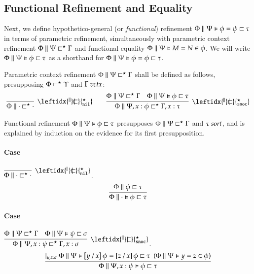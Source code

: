 \documentclass[11pt]{article}
\theoremstyle{definition}
\theoremstyle{remark}
\numberwithin{equation}{section}
\def\IModeColorName{MidnightBlue}
\def\OModeColorName{Maroon}
\def\IModeColorName{Black}
\def\OModeColorName{Black}
\newcommand\IMode[1]{{\color{\IModeColorName}{#1}}}
\newcommand\OMode[1]{{\color{\OModeColorName}{#1}}}
\newcommand\HypJ[2]{#1\ \ (#2)}
\newcommand\GenJ[2]{\vert_{\IMode{#1}}\; #2}
\newcommand\IsSort[1]{\IMode{#1}\ \textit{sort}}
\newcommand\IsVarCtx[1]{\IMode{#1}\ \textit{vctx}}
\newcommand\Subst[3]{%
  \left[#1\, /\, #2\right]#3%
}
\newcommand\Refines[3]{\IMode{#1}\parallel \IMode{#2} \sqsubset \OMode{#3}}
\newcommand\RefinesCtx[2]{\IMode{#1}\sqsubset^\star\OMode{#2}}
\newcommand\HRefines[4]{\IMode{#1}\parallel\IMode{#2}\vDash\IMode{#3}\sqsubset\OMode{#4}}
\newcommand\HEqRefines[5]{\IMode{#1}\parallel\IMode{#2}\vDash\IMode{#3}=\IMode{#4}\sqsubset\OMode{#5}}
\newcommand\PRefinesCtx[3]{\IMode{#1}\parallel\IMode{#2}\sqsubset^\star\OMode{#3}}
\newcommand\HRMemEq[5]{\IMode{#1}\parallel \IMode{#2} \vDash \IMode{#3}=\IMode{#4}\in \IMode{#5}}
\begin{document}
\subsection{Functional Refinement and Equality}

\newcommand\PRefinesCtxNil{\leftidx{^\parallel}{\!\!\sqsubset}{^\star_{\mathtt{nil}}}}
\newcommand\PRefinesCtxSnoc{\leftidx{^\parallel}{\!\!\sqsubset}{^\star_{\mathtt{snoc}}}}

Next, we define hypothetico-general (or \emph{functional}) refinement
$\HEqRefines{\Phi}{\Psi}{\phi}{\psi}{\tau}$ in terms of parametric refinement,
simultaneously with parametric context refinement
$\PRefinesCtx{\Phi}{\Psi}{\Gamma}$ and functional equality
$\HRMemEq{\Phi}{\Psi}{M}{N}{\phi}$. We will write
$\HRefines{\Phi}{\Psi}{\phi}{\tau}$ as a shorthand for
$\HEqRefines{\Phi}{\Psi}{\phi}{\phi}{\tau}$.

\newcommand\DefPRefinesCtxNil[1]{
  \infer[\PRefinesCtxNil]{
    \PRefinesCtx{#1}{\cdot}{\cdot}
  }{
  }
}
\newcommand\DefPRefinesCtxSnoc[6]{
  \infer[\PRefinesCtxSnoc]{
    \PRefinesCtx{#1}{#2,#3:#4}{#5,#3:#6}
  }{
    \PRefinesCtx{#1}{#2}{#5} &
    \HRefines{#1}{#2}{#4}{#6}
  }
}

Parametric context refinement $\PRefinesCtx{\Phi}{\Psi}{\Gamma}$ shall be
defined as follows, presupposing $\RefinesCtx{\Phi}{\Upsilon}$ and
$\IsVarCtx{\Gamma}$:
\begin{gather*}
  \DefPRefinesCtxNil{\Phi}\qquad
  \DefPRefinesCtxSnoc{\Phi}{\Psi}{x}{\phi}{\Gamma}{\tau}
\end{gather*}

Functional refinement $\HRefines{\Phi}{\Psi}{\phi}{\tau}$ presupposes
$\PRefinesCtx{\Phi}{\Psi}{\Gamma}$ and $\IsSort{\tau}$, and is explained by
induction on the evidence for its first presupposition.

\paragraph{Case} $\DefPRefinesCtxNil{\Phi}$.
\[
  \infer{
    \HRefines{\Phi}{\cdot}{\phi}{\tau}
  }{
    \Refines{\Phi}{\phi}{\tau}
  }
\]

\paragraph{Case} $\DefPRefinesCtxSnoc{\Phi}{\Psi}{x}{\psi}{\Gamma}{\sigma}$.
\begin{gather*}
  \infer{
    \HRefines{\Phi}{\Psi,x:\psi}{\phi}{\tau}
  }{
    \GenJ{y,z:\sigma}{
      \HypJ{
        \HEqRefines{\Phi}{\Psi}{\Subst{y}{x}{\phi}}{\Subst{z}{x}{\phi}}{\tau}
      }{
        \HRMemEq{\Phi}{\Psi}{y}{z}{\phi}
      }
    }
  }
\end{gather*}
\end{document}
